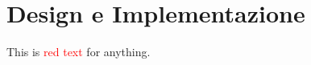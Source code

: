 \documentclass[../main.tex]{subfiles}
\begin{document}
\chapter{Design e Implementazione}
\label{chap:DesignAndImplementation}

This is \textcolor{red}{red text} for anything.
\end{document}
